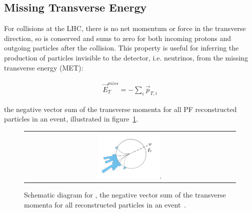 \subsection{Missing Transverse Energy}
For collisions at the LHC, there is no net momentum or force in the transverse direction, so \pT is conserved and sums to zero for both incoming protons and outgoing particles after the collision.
This property is useful for inferring the production of particles invisible to the detector, i.e. neutrinos, from the missing transverse energy (MET):
\begin{linenomath*}
\begin{align}
\vec{E}_T^{miss}=-\sum_{i} \vec{p}_{T,i}
\end{align}
\end{linenomath*}
the negative vector sum of the transverse momenta for all PF reconstructed particles in an event, illustrated in figure~\ref{met_schematic}.
\begin{figure}[htb]
  \begin{center}
    \begin{tabular}{c}
        \includegraphics[width=0.3\textwidth]{fig_Event_Reconstruction/met_schematic.pdf}.
    \end{tabular}
    \caption{Schematic diagram for \MET, the negative vector sum of the transverse momenta for all reconstructed particles in an event~\cite{METSchematicDiagram}.
            }
    \label{met_schematic}
  \end{center}
\end{figure}


